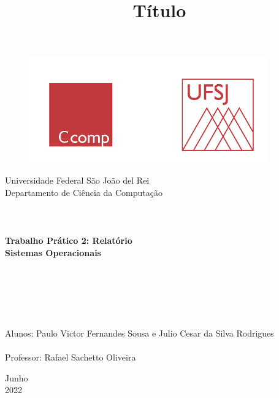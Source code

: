 \documentclass[a4paper, 12pt]{article}
\begin{document}

\begin{titlepage}
	\begin{center}
	
	\begin{figure}[ht]
    \centering
    \includegraphics[width=.44\textwidth]{LogoUFSJ.PNG}
    \label{fig:Capturar.PNG}
    \end{figure}

    	\Huge{Universidade Federal São João del Rei}\\
		\Large{Departamento de Ciência da Computação}\\ 

        \vspace{110pt}
        \textbf{\LARGE{
        \\
        \\
        \\
        Trabalho Prático 2: Relatório\\
        \vspace{0.5cm}
        \Large{Sistemas Operacionais}
        \\
        \\
        \\
        }}
        
		\title{{\large{Título}}}
		\vspace{2cm}
	\end{center}
	    
    \begin{flushleft}
		\begin{tabbing}
		\\
		\\
		\\	
		\large{Alunos: Paulo Victor Fernandes Sousa e Julio Cesar da Silva Rodrigues}\\
	    \\
		\large{Professor: Rafael Sachetto Oliveira}\\
	    \end{tabbing}
    \end{flushleft}
	\vspace{1cm}
	
	\begin{center}
		\vspace{\fill}
			Junho\\
		    2022
	\end{center}
\end{titlepage}
\end{document}
